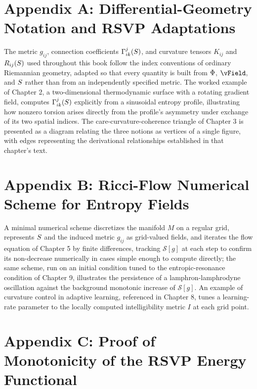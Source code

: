 \chapter*{Appendix A: Differential-Geometry Notation and RSVP Adaptations}

The metric $g_{ij}$, connection coefficients $\Gamma^j_{ik}(S)$, and curvature tensors $K_{ij}$ and $R_{ij}(S)$ used throughout this book follow the index conventions of ordinary Riemannian geometry, adapted so that every quantity is built from $\Phi$, $\vField$, and $S$ rather than from an independently specified metric. The worked example of Chapter 2, a two-dimensional thermodynamic surface with a rotating gradient field, computes $\Gamma^j_{ik}(S)$ explicitly from a sinusoidal entropy profile, illustrating how nonzero torsion arises directly from the profile's asymmetry under exchange of its two spatial indices. The care-curvature-coherence triangle of Chapter 3 is presented as a diagram relating the three notions as vertices of a single figure, with edges representing the derivational relationships established in that chapter's text.

\chapter*{Appendix B: Ricci-Flow Numerical Scheme for Entropy Fields}

A minimal numerical scheme discretizes the manifold $M$ on a regular grid, represents $S$ and the induced metric $g_{ij}$ as grid-valued fields, and iterates the flow equation of Chapter 5 by finite differences, tracking $\mathcal{S}[g]$ at each step to confirm its non-decrease numerically in cases simple enough to compute directly; the same scheme, run on an initial condition tuned to the entropic-resonance condition of Chapter 9, illustrates the persistence of a lamphron-lamphrodyne oscillation against the background monotonic increase of $\mathcal{S}[g]$. An example of curvature control in adaptive learning, referenced in Chapter 8, tunes a learning-rate parameter to the locally computed intelligibility metric $I$ at each grid point.

\chapter*{Appendix C: Proof of Monotonicity of the RSVP Energy Functional}

